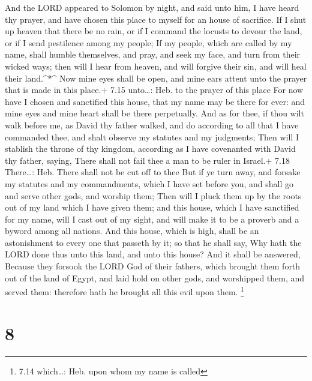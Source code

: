  And the LORD appeared to Solomon by night, and said unto
him, I have heard thy prayer, and have chosen this place to myself for
an house of sacrifice.  If I shut up heaven that there be
no rain, or if I command the locusts to devour the land, or if I send
pestilence among my people;  If my people, which are called
by my name, shall humble themselves, and pray, and seek my face, and
turn from their wicked ways; then will I hear from heaven, and will
forgive their sin, and will heal their land.\^{}*\^{}  Now
mine eyes shall be open, and mine ears attent unto the prayer that is
made in this place.+ 7.15 unto\ldots: Heb. to the prayer of this place
 For now have I chosen and sanctified this house, that my
name may be there for ever: and mine eyes and mine heart shall be there
perpetually.  And as for thee, if thou wilt walk before me,
as David thy father walked, and do according to all that I have
commanded thee, and shalt observe my statutes and my judgments;
 Then will I stablish the throne of thy kingdom, according
as I have covenanted with David thy father, saying, There shall not fail
thee a man to be ruler in Israel.+ 7.18 There\ldots: Heb. There shall
not be cut off to thee  But if ye turn away, and forsake my
statutes and my commandments, which I have set before you, and shall go
and serve other gods, and worship them;  Then will I pluck
them up by the roots out of my land which I have given them; and this
house, which I have sanctified for my name, will I cast out of my sight,
and will make it to be a proverb and a byword among all nations.
 And this house, which is high, shall be an astonishment to
every one that passeth by it; so that he shall say, Why hath the LORD
done thus unto this land, and unto this house?  And it
shall be answered, Because they forsook the LORD God of their fathers,
which brought them forth out of the land of Egypt, and laid hold on
other gods, and worshipped them, and served them: therefore hath he
brought all this evil upon them. \footnote{7.14 which\ldots: Heb. upon
  whom my name is called}

\hypertarget{section-7}{%
\section{8}\label{section-7}}

